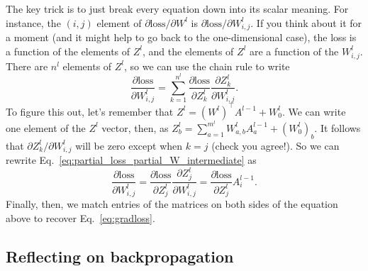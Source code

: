 The key trick is to just break every equation down into its scalar meaning. For instance, the $(i,j)$ element of $\partial \text{loss} / \partial W^l$ is $\partial \text{loss} / \partial W^l_{i,j}$. If you think about it for a moment (and it might help to go back to the one-dimensional case), the loss is a function of the elements of $Z^l$, and the elements of $Z^l$ are a function of the $W^l_{i,j}$. There are $n^l$ elements of $Z^l$, so we can use the chain rule to write
\begin{equation}
  \label{eq:partial_loss_partial_W_intermediate}
  \frac{ \partial \text{loss} }{ \partial W^l_{i,j} }
  = \sum_{k=1}^{n^l} \frac{ \partial \text{loss} }{ \partial Z^l_k } \frac{ \partial Z^l_k }{ \partial W^l_{i,j} }.
\end{equation}
To figure this out, let's remember that $Z^l = (W^l)^\top A^{l-1} + W_0^l$. We can write one element of the $Z^l$ vector, then, as $Z^l_{b} = \sum_{a=1}^{m^l} W_{a,b}^{l} A_a^{l-1} + (W_0^l)_b$. It follows that $\partial Z^l_k / \partial W^l_{i,j}$ will be zero except when $k=j$ (check you agree!). So we can rewrite Eq.~\ref{eq:partial_loss_partial_W_intermediate} as
\begin{equation}
  \label{eq:partial_loss_partial_W_entries}
  \frac{ \partial \text{loss} }{ \partial W^l_{i,j} }
  = \frac{ \partial \text{loss} }{ \partial Z^l_j } \frac{ \partial Z^l_j }{ \partial W^l_{i,j} }
  = \frac{ \partial \text{loss} }{ \partial Z^l_j } A_i^{l-1}.
\end{equation}
Finally, then, we match entries of the matrices on both sides of the equation above to recover Eq.~\ref{eq:gradloss}.





\subsection{Reflecting on backpropagation}

